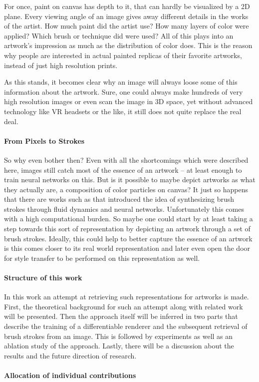 For once, paint on canvas has depth to it, that can hardly be visualized by a 2D plane.
Every viewing angle of an image gives away different details in the works of the artist.
How much paint did the artist use?
How many layers of color were applied?
Which brush or technique did were used?
All of this plays into an artwork's impression as much as the distribution of color does.
This is the reason why people are interested in actual painted replicas of their favorite
artworks, instead of just high resolution prints.

As this stands, it becomes clear why an image will always loose some of this information
about the artwork.
Sure, one could always make hundreds of very high resolution images or even scan
the image in 3D space, yet without advanced technology like VR headsets or the like,
it still does not quite replace the real deal.

\paragraph{From Pixels to Strokes}
So why even bother then?
Even with all the shortcomings which were described here, images still catch most of
the essence of an artwork -- at least enough to train neural networks on this.
But is it possible to maybe depict artworks as what they actually are, a composition
of color particles on canvas?
It just so happens that there are works such as \cite{adobe stroke paper} that
introduced the idea of synthesizing brush strokes through fluid dynamics and neural networks.
Unfortunately this comes with a high computational burden.
So maybe one could start by at least taking a step towards this sort of representation
by depicting an artwork through a set of brush strokes.
Ideally, this could help to better capture the essence of an artwork is this comes
closer to its real world representation and later even open the door for style transfer
to be performed on this representation as well.


\paragraph{Structure of this work}
In this work an attempt at retrieving such representations for artworks is made.
First, the theoretical background for such an attempt along with related work will be presented.
Then the approach itself will be inferred in two parts that describe the training of a differentiable renderer
and the subsequent retrieval of brush strokes from an image.
This is followed by experiments as well as an ablation study of the approach.
Lastly, there will be a discussion about the results and the future direction of research.



\paragraph{Allocation of individual contributions}

